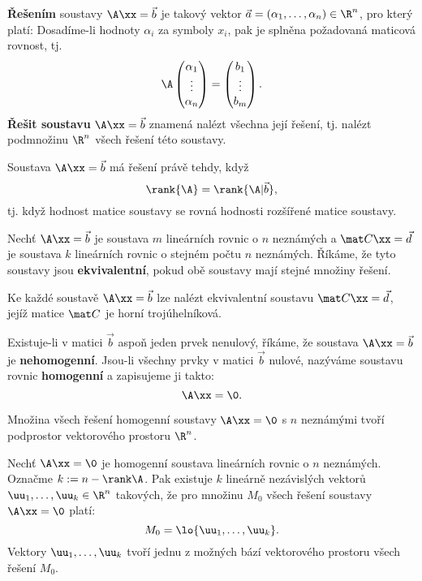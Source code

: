   
\begin{df}
{\bf Řešením} soustavy $\A\xx=\vec b$ je takový vektor $\vec a=(\alpha_1,\ldots,\alpha_n)\in\R^n$, pro který platí: Dosadíme-li hodnoty $\alpha_i$ za symboly $x_i$, pak je splněna požadovaná maticová rovnost, tj.
$$ \A \begin{pmatrix}\alpha_1\\\vdots\\\alpha_n\end{pmatrix}=\begin{pmatrix}b_1\\\vdots\\b_m\end{pmatrix}. $$
{\bf Řešit soustavu} $\A\xx=\vec b$ znamená nalézt všechna její řešení, tj. nalézt podmnožinu $\R^n$ všech řešení této soustavy.
\end{df}

\begin{veta}[Frobeniova]
Soustava $\A\xx=\vec b$ má řešení právě tehdy, když
$$ \rank{\A}=\rank{\A|\vec b}, $$
tj. když hodnost matice soustavy se rovná hodnosti rozšířené matice soustavy.
\end{veta}

  
\begin{df}
Nechť $\A\xx=\vec b$ je soustava $m$ lineárních rovnic o $n$ neznámých a $\mat C\xx=\vec d$ je soustava $k$ lineárních rovnic o stejném počtu $n$ neznámých.
Říkáme, že tyto soustavy jsou {\bf ekvivalentní}, pokud obě soustavy mají stejné množiny řešení.
\end{df}

\begin{veta}
Ke každé soustavě $\A\xx=\vec b$ lze nalézt ekvivalentní soustavu $\mat C\xx=\vec d$, jejíž matice $\mat C$ je horní trojúhelníková.
\end{veta}
  
\begin{df}
Existuje-li v matici $\vec b$ aspoň jeden prvek nenulový, říkáme, že soustava $\A\xx=\vec b$ je {\bf nehomogenní}.
Jsou-li všechny prvky v matici $\vec b$ nulové, nazýváme soustavu rovnic {\bf homogenní} a zapisujeme ji takto:
$$ \A\xx=\0. $$
\end{df}

\begin{veta}
Množina všech řešení homogenní soustavy $\A\xx=\0$ s $n$ neznámými tvoří podprostor vektorového prostoru $\R^n$.
\end{veta}
  
\begin{veta}
Nechť $\A\xx=\0$ je homogenní soustava lineárních rovnic o $n$ neznámých.
Označme $k:=n-\rank\A$.
Pak existuje $k$ lineárně nezávislých vektorů $\uu_1,\ldots,\uu_k\in\R^n$ takových, že pro množinu $M_0$ všech řešení soustavy $\A\xx=\0$ platí:
$$ M_0=\lo{\uu_1,\ldots,\uu_k}. $$
Vektory $\uu_1,\ldots,\uu_k$ tvoří jednu z možných bází vektorového prostoru všech řešení $M_0$.
\end{veta}

